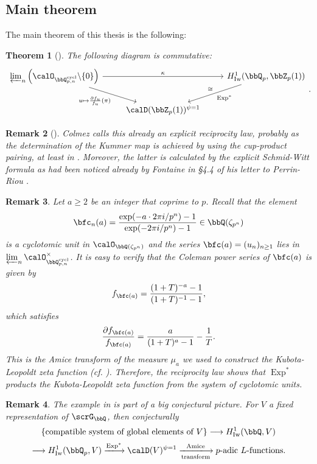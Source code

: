\documentclass[a4paper,oneside]{amsart}
\let\opn\operatorname
\DeclareMathOperator{\cycl}{cycl}
\newcommand{\lto}{\longrightarrow}
\let\xlto\xlongrightarrow
\newcommand{\Iw}{\opn{Iw}}
\newtheorem{theorem}{Theorem}[section]
\newtheorem{remark}[theorem]{Remark}
\numberwithin{equation}{section}
\begin{document}
\subsection{Main theorem}
The main theorem of this thesis is the following:
\begin{theorem}[{\cite[Proposition V.3.2(iii)]{cherbonnier_theorie_1999}\cite[Theorem 7.4.1]{colmez_fontaines_nodate}\cite[Theorem 6.2]{schneiderCoatesWilesHomomorphisms2016}}\protect\footnotemark]\label{thm:main}
    The following diagram is commutative:
    $$\begin{tikzcd}
            \varprojlim_n \left(\calO_{\bbQ_{p,n}^{\cycl}}\backslash\{0\}\right)\ar[rr,"\kappa"]\ar[dr,"u\mapsto \frac{\partial f_u}{f_u}(\pi)"']&&H_{\Iw}^1(\bbQ_p,\bbZ_p(1))\ar[dl,"\opn{Exp}^*","\cong"']\\
            &\calD(\bbZ_p(1))^{\psi=1}&
        \end{tikzcd}.$$
\end{theorem}
\begin{remark}[{\cite[19]{venjakobExplicitReciprocityLaws2023}}]
    Colmez \cite[Section 7.4]{colmez_fontaines_nodate} calls this already an explicit reciprocity law, probably as the determination of the Kummer map is achieved by using the cup-product pairing, at least in \cite[Section 6]{schneiderCoatesWilesHomomorphisms2016}. Moreover, the latter is calculated by the explicit Schmid-Witt formula as had been noticed already by Fontaine in §4.4 of his letter to Perrin-Riou \cite{perrin-riou_theorie_1994}.
\end{remark}
\begin{remark}\label{rmk:23241}
    Let $a\geq 2$ be an integer that coprime to $p$. Recall that the element
    $$\bfc_n(a)=\frac{\exp(-a\cdot2\pi i/p^n)-1}{\exp(-2\pi i/p^n)-1}\in\bbQ(\zeta_{p^n})$$
    is a cyclotomic unit in $\calO_{\bbQ(\zeta_{p^n})}$ and the series $\bfc(a)=(u_n)_{n\geq 1}$ lies in $\varprojlim_n \calO_{\bbQ_{p,n}^{\cycl}}^\times$. It is easy to verify that the Coleman power series of $\bfc(a)$ is given by
    $$f_{\bfc(a)}=\frac{(1+T)^{-a}-1}{(1+T)^{-1}-1},$$
    which satisfies
    $$\frac{\partial f_{\bfc(a)}}{f_{\bfc(a)}}=\frac{a}{(1+T)^a-1}-\frac{1}{T}.$$
    This is the Amice transform of the measure $\mu_a$ we used to construct the Kubota-Leopoldt zeta function (cf. \cite[Proposition 1.6]{colmez_fonction_nodate}). Therefore, the reciprocity law shows that $\opn{Exp}^*$ products the Kubota-Leopoldt zeta function from the system of cyclotomic units.
\end{remark}
\begin{remark}
    The example in  is part of a big conjectural picture. For $V$ a fixed representation of $\scrG_\bbQ$, then conjecturally
    $$\{\text{compatible system of global elements of $V$}\}\lto H_{\Iw}^1(\bbQ,V)$$
    $$\lto H_{\Iw}^1(\bbQ_p,V)\xlto{\opn{Exp}^*}\calD(V)^{\psi=1}\xlto[\text{transform}]{\text{Amice}} p\text{-adic $L$-functions}.$$
\end{remark}
\end{document}
